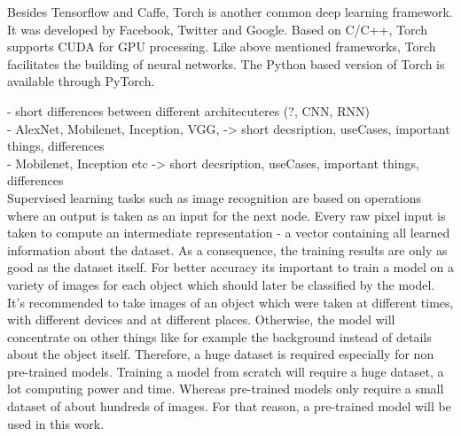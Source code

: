 Besides Tensorflow and Caffe, Torch is another common deep learning framework. It was developed by Facebook, Twitter and Google. Based on C/C++, Torch supports CUDA for GPU processing. Like above mentioned frameworks, Torch facilitates the building of neural networks. The Python based version of Torch is available through PyTorch.
		
		- short differences between different architecuteres (?, CNN, RNN) \\
 		- AlexNet, Mobilenet, Inception, VGG, -> short decsription, useCases, important things, differences \\
 		- Mobilenet, Inception etc -> short decsription, useCases, important things, differences \\
 		
Supervised learning tasks such as image recognition are based on operations where an output is taken as an input for the next node. Every raw pixel input is taken to compute an intermediate representation - a vector containing all learned information about the dataset. As a consequence, the training results are only as good as the dataset itself. For better accuracy its important to train a model on a variety of images for each object which should later be classified by the model. It's recommended to take images of an object which were taken at different times, with different devices and at different places. Otherwise, the model will concentrate on other things like for example the background instead of details about the object itself. Therefore, a huge dataset is required especially for non pre-trained models. Training a model from scratch will require a huge dataset, a lot computing power and time. Whereas pre-trained models only require a small dataset of about hundreds of images. For that reason, a pre-trained model will be used in this work.